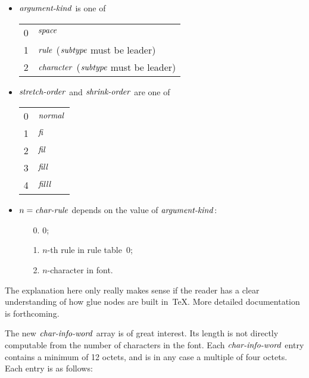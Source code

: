 \documentclass[fleqn]{article}
\newcommand{\myit}[1]{\mbox{\emph{#1}}}
\begin{document}
\begin{itemize}
\begin{itemize}
\item $\myit{argument-kind}$ is one of
\vspace*{.1cm}

\begin{tabular}{ll}
0 & $\myit{space}$\\
1 & $\myit{rule}$ ($\myit{subtype}$ must be leader)\\
2 & $\myit{character}$ ($\myit{subtype}$ must be leader)\\
\end{tabular}
\vspace*{.1cm}

\item $\myit{stretch-order}$ and $\myit{shrink-order}$
are one of
\vspace*{.1cm}

\begin{tabular}{ll}
0 & $\myit{normal}$\\
1 & $\myit{fi}$\\
2 & $\myit{fil}$\\
3 & $\myit{fill}$\\
4 & $\myit{filll}$\\
\end{tabular}
\vspace*{.1cm}

\item $n=\myit{char-rule}$ depends on the value of
$\myit{argument-kind}$:
\begin{enumerate}
\item[0.] 0;
\item[1.] $n$-th rule in rule table~0;
\item[2.] $n$-character in font.
\end{enumerate}
\end{itemize}
The explanation here only really makes sense if the reader has a clear
understanding of how glue nodes are built in~\TeX.  More detailed
documentation is forthcoming.
\end{itemize}

The new $\myit{char-info-word}$ array is of great interest.  Its length
is not directly computable from the number of characters in the font.  Each
$\myit{char-info-word}$ entry contains a minimum of 12 octets, and is in
any case a multiple of four octets. Each entry is as follows:
\vspace*{.1cm}
\end{document}
